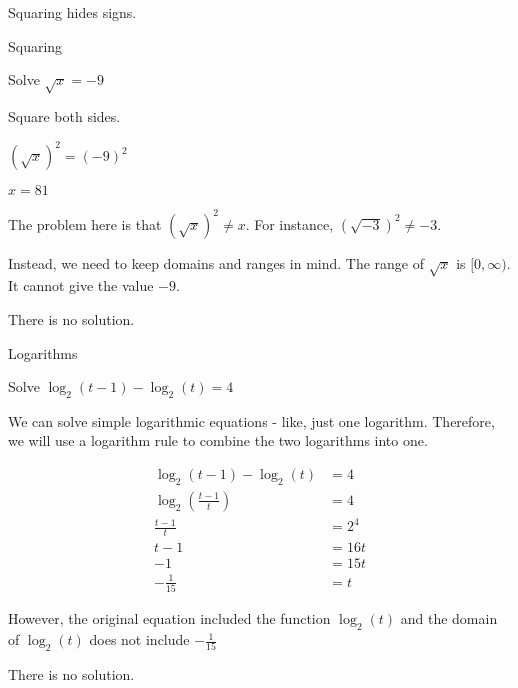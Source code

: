 \documentclass{ximera}
\begin{document}
Squaring hides signs.


\begin{example} Squaring


Solve $\sqrt{x} = -9$

\begin{explanation}

Square both sides.


$(\sqrt{x})^2 = (-9)^2$

$x = 81$



The problem here is that  $(\sqrt{x})^2 \ne x$.  For instance, $(\sqrt{-3})^2 \ne -3$.


Instead, we need to keep domains and ranges in mind.  The range of $\sqrt{x}$ is $[0, \infty)$. It cannot give the value $-9$.


There is no solution.


\end{explanation}

\end{example}









\begin{example} Logarithms


Solve $\log_2(t-1) - \log_2(t) = 4$


\begin{explanation}


We can solve simple logarithmic equations - like, just one logarithm.  Therefore, we will use a logarithm rule to combine the two logarithms into one.




\begin{align*}
\log_2(t-1) - \log_2(t) & = 4   \\
\log_2 \left( \frac{t-1}{t} \right)  & = 4  \\
\frac{t-1}{t} & = 2^4  \\
 t-1 & = 16t  \\
-1 & = 15t  \\
-\frac{1}{15} & = t
\end{align*}



However, the original equation included the function $\log_2(t)$ and the domain of $\log_2(t)$ does not include $-\frac{1}{15}$


There is no solution.

\end{explanation}

\end{example}
\end{document}
